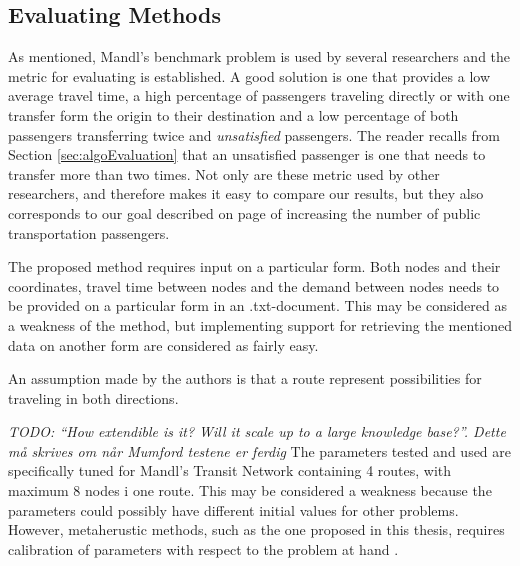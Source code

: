 \subsection{Evaluating Methods}

As mentioned, Mandl's benchmark problem is used by several researchers and the metric for evaluating is established. A good solution is one that provides a low average travel time, a high percentage of passengers traveling directly or with one transfer form the origin to their destination and a low percentage of both passengers transferring twice and \textit{unsatisfied} passengers. The reader recalls from Section \vref{sec:algoEvaluation} that an unsatisfied passenger is one that needs to transfer more than two times. Not only are these metric used by other researchers, and therefore makes it easy to compare our results, but they also corresponds to our goal described on page \pageref{itm:goal} of increasing  the number of public transportation passengers. 

The proposed method requires input on a particular form. Both nodes and their coordinates, travel time between nodes and the demand between nodes needs to be provided on a particular form in an .txt-document. This may be considered as a weakness of the method, but implementing support for retrieving the mentioned data on another form are considered as fairly easy. 

An assumption made by the authors is that a route represent possibilities for traveling in both directions. 

\emph{\color{blue} TODO: ``How extendible is it? Will it scale up to a large knowledge base?''. Dette må skrives om når Mumford testene er ferdig}
The parameters tested and used are specifically tuned for Mandl's Transit Network containing 4 routes, with maximum 8 nodes i one route. This may be considered a weakness because the parameters could possibly have different initial values for other problems. However, metaherustic methods, such as the one proposed in this thesis, requires calibration of parameters with respect to the problem at hand \citep{dobslaw09}. 


